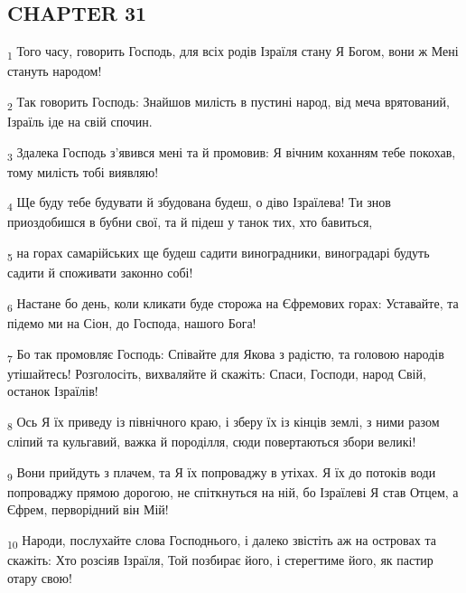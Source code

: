 \subsection{CHAPTER 31}
\begin{tcolorbox}
\textsubscript{1} Того часу, говорить Господь, для всіх родів Ізраїля стану Я Богом, вони ж Мені стануть народом!
\end{tcolorbox}
\begin{tcolorbox}
\textsubscript{2} Так говорить Господь: Знайшов милість в пустині народ, від меча врятований, Ізраїль іде на свій спочин.
\end{tcolorbox}
\begin{tcolorbox}
\textsubscript{3} Здалека Господь з'явився мені та й промовив: Я вічним коханням тебе покохав, тому милість тобі виявляю!
\end{tcolorbox}
\begin{tcolorbox}
\textsubscript{4} Ще буду тебе будувати й збудована будеш, о діво Ізраїлева! Ти знов приоздобишся в бубни свої, та й підеш у танок тих, хто бавиться,
\end{tcolorbox}
\begin{tcolorbox}
\textsubscript{5} на горах самарійських ще будеш садити виноградники, виноградарі будуть садити й споживати законно собі!
\end{tcolorbox}
\begin{tcolorbox}
\textsubscript{6} Настане бо день, коли кликати буде сторожа на Єфремових горах: Уставайте, та підемо ми на Сіон, до Господа, нашого Бога!
\end{tcolorbox}
\begin{tcolorbox}
\textsubscript{7} Бо так промовляє Господь: Співайте для Якова з радістю, та головою народів утішайтесь! Розголосіть, вихваляйте й скажіть: Спаси, Господи, народ Свій, останок Ізраїлів!
\end{tcolorbox}
\begin{tcolorbox}
\textsubscript{8} Ось Я їх приведу із північного краю, і зберу їх із кінців землі, з ними разом сліпий та кульгавий, важка й породілля, сюди повертаються збори великі!
\end{tcolorbox}
\begin{tcolorbox}
\textsubscript{9} Вони прийдуть з плачем, та Я їх попроваджу в утіхах. Я їх до потоків води попроваджу прямою дорогою, не спіткнуться на ній, бо Ізраїлеві Я став Отцем, а Єфрем, перворідний він Мій!
\end{tcolorbox}
\begin{tcolorbox}
\textsubscript{10} Народи, послухайте слова Господнього, і далеко звістіть аж на островах та скажіть: Хто розсіяв Ізраїля, Той позбирає його, і стерегтиме його, як пастир отару свою!
\end{tcolorbox}
